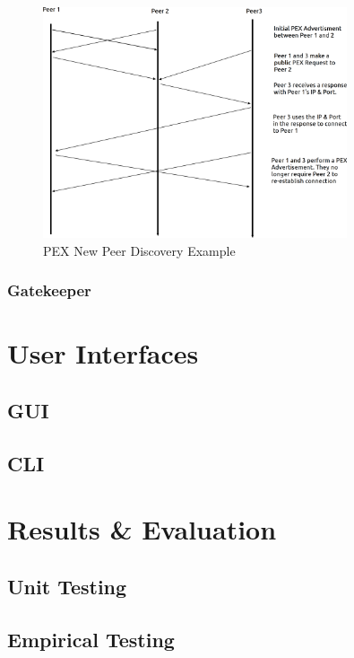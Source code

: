 \documentclass[11pt, a4paper, twocolumn, twoside]{report}
\begin{document}
\begin{figure}[hb]
 \centering
 \includegraphics[width=0.8\textwidth]{pex-new-peer}
 \caption{PEX New Peer Discovery Example}
 \label{fig:pex-new-peer}
\end{figure}

\subsection{Gatekeeper}

\chapter{User Interfaces}

\section{GUI}

\section{CLI}

\chapter{Results \& Evaluation}

\section{Unit Testing}

\section{Empirical Testing}
\end{document}
